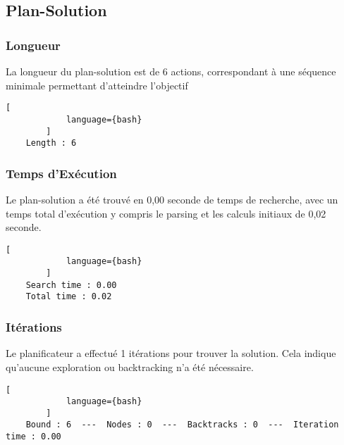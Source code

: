 \documentclass[../CSC_5RO16_TA_TP5.tex]{subfiles}
\begin{document}
\subsection{Plan-Solution}
\subsubsection{Longueur}
\begin{resolution}
    La longueur du plan-solution est de 6 actions, correspondant à une séquence minimale permettant d'atteindre l'objectif

    \begin{scriptsize}\mycode
        \begin{lstlisting}[
            language={bash}
        ]
    Length : 6
        \end{lstlisting}
    \end{scriptsize}
\end{resolution}

\subsubsection{Temps d'Exécution}
\begin{resolution}
    Le plan-solution a été trouvé en 0,00 seconde de temps de recherche, avec un temps total d'exécution y compris le parsing et les calculs initiaux de 0,02 seconde.

    \begin{scriptsize}\mycode
        \begin{lstlisting}[
            language={bash}
        ]
    Search time : 0.00
    Total time : 0.02
        \end{lstlisting}
    \end{scriptsize}
\end{resolution}

\subsubsection{Itérations}
\begin{resolution}
    Le planificateur a effectué 1 itérations pour trouver la solution. Cela indique qu'aucune exploration ou backtracking n'a été nécessaire.

    \begin{scriptsize}\mycode
        \begin{lstlisting}[
            language={bash}
        ]
    Bound : 6  ---  Nodes : 0  ---  Backtracks : 0  ---  Iteration time : 0.00
        \end{lstlisting}
    \end{scriptsize}
\end{resolution}
\end{document}
